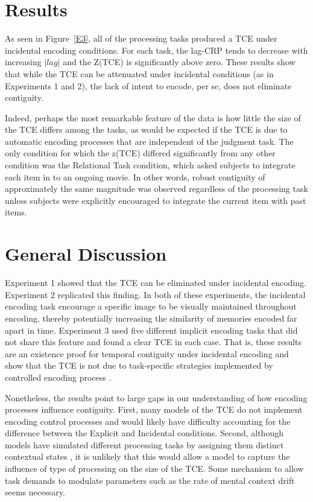 \documentclass[jou,natbib]{apa6} %
\begin{document}
\section{Results}

As seen in Figure~\ref{E3}, all of the processing tasks produced a TCE under incidental encoding conditions. For each task, the lag-CRP tends to decrease with increasing $|lag|$ and the Z(TCE) is significantly above zero. These results show that while the TCE can be attenuated under incidental conditions (as in Experiments 1 and 2), the lack of intent to encode, per se, does not eliminate contiguity. 

Indeed, perhaps the most remarkable feature of the data is how little the size of the TCE differs among the tasks, as would be expected if the TCE is due to automatic encoding processes that are independent of the judgment task. The only condition for which the z(TCE) differed significantly from any other condition was the Relational Task condition, which asked subjects to integrate each item in to an ongoing movie. In other words, robust contiguity of approximately the same magnitude was observed regardless of the processing task unless subjects were explicitly encouraged to integrate the current item with past items.

\begin{figure*}%
\caption{The temporal contiguity effect (TCE) under incidental encoding with different judgment tasks. \paneltext}
\label{E3}
\end{figure*}

\section{General Discussion}

Experiment 1 showed that the TCE can be eliminated under incidental encoding. Experiment 2 replicated this finding. In both of these experiments, the incidental encoding task encourage a specific image to be visually maintained throughout encoding, thereby potentially increasing the similarity of memories encoded far apart in time. Experiment 3 used five different implicit encoding tasks that did not share this feature and found a clear TCE in each case. That is, these results are an existence proof for temporal contiguity under incidental encoding and show that the TCE is not due to task-specific strategies implemented by controlled encoding process \citep[cf.][]{Hint16}.

Nonetheless, the results point to large gaps in our understanding of how encoding processes influence contiguity. First, many models of the TCE do not implement encoding control processes \citep[but see][]{LehmMalm13} and would likely have difficulty accounting for the difference between the Explicit and Incidental conditions. Second, although models have simulated different processing tasks by assigning them distinct contextual states \citep{PolyEtal09}, it is unlikely that this would allow a model to capture the influence of type of processing on the size of the TCE. Some mechanism to allow task demands to modulate parameters such as the rate of mental context drift seems necessary.  
\end{document}
